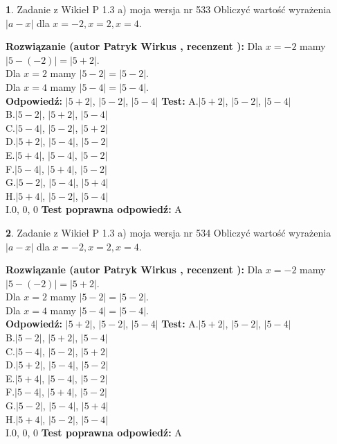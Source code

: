 \documentclass[12pt, a4paper]{article}
\theoremstyle{definition} %
\newtheorem{zad}{}
\newcommand{\zadStart}[1]{\begin{zad}#1\newline}
\newcommand{\zadStop}{\end{zad}}
\newcommand{\rozwStart}[2]{\noindent \textbf{Rozwiązanie (autor #1 , recenzent #2): }\newline}
\newcommand{\rozwStop}{\newline}
\newcommand{\odpStart}{\noindent \textbf{Odpowiedź:}\newline}
\newcommand{\odpStop}{\newline}
\newcommand{\testStart}{\noindent \textbf{Test:}\newline}
\newcommand{\testStop}{\newline}
\newcommand{\kluczStart}{\noindent \textbf{Test poprawna odpowiedź:}\newline}
\newcommand{\kluczStop}{\newline}
\begin{document}
\zadStart{Zadanie z Wikieł P 1.3 a) moja wersja nr 533}
Obliczyć wartość wyrażenia $|a - x|$ dla $x=-2,x=2,x=4$.
\zadStop
\rozwStart{Patryk Wirkus}{}
Dla $x = -2$ mamy $|5 - (-2)| = |5 + 2|$.\\
Dla $x = 2$ mamy $|5 - 2| = |5 - 2|$.\\
Dla $x = 4$ mamy $|5 - 4| = |5 - 4|$.\\
\rozwStop
\odpStart
$|5 + 2|$, $|5 - 2|$, $|5 - 4|$
\odpStop
\testStart
A.$|5 + 2|$, $|5 - 2|$, $|5 - 4|$\\
B.$|5 - 2|$, $|5 + 2|$, $|5 - 4|$\\
C.$|5 - 4|$, $|5 - 2|$, $|5 + 2|$\\
D.$|5 + 2|$, $|5 - 4|$, $|5 - 2|$\\
E.$|5 + 4|$, $|5 - 4|$, $|5 - 2|$\\
F.$|5 - 4|$, $|5 + 4|$, $|5 - 2|$\\
G.$|5 - 2|$, $|5 - 4|$, $|5 + 4|$\\
H.$|5 + 4|$, $|5 - 2|$, $|5 - 4|$\\
I.$0$, $0$, $0$
\testStop
\kluczStart
A
\kluczStop



\zadStart{Zadanie z Wikieł P 1.3 a) moja wersja nr 534}
Obliczyć wartość wyrażenia $|a - x|$ dla $x=-2,x=2,x=4$.
\zadStop
\rozwStart{Patryk Wirkus}{}
Dla $x = -2$ mamy $|5 - (-2)| = |5 + 2|$.\\
Dla $x = 2$ mamy $|5 - 2| = |5 - 2|$.\\
Dla $x = 4$ mamy $|5 - 4| = |5 - 4|$.\\
\rozwStop
\odpStart
$|5 + 2|$, $|5 - 2|$, $|5 - 4|$
\odpStop
\testStart
A.$|5 + 2|$, $|5 - 2|$, $|5 - 4|$\\
B.$|5 - 2|$, $|5 + 2|$, $|5 - 4|$\\
C.$|5 - 4|$, $|5 - 2|$, $|5 + 2|$\\
D.$|5 + 2|$, $|5 - 4|$, $|5 - 2|$\\
E.$|5 + 4|$, $|5 - 4|$, $|5 - 2|$\\
F.$|5 - 4|$, $|5 + 4|$, $|5 - 2|$\\
G.$|5 - 2|$, $|5 - 4|$, $|5 + 4|$\\
H.$|5 + 4|$, $|5 - 2|$, $|5 - 4|$\\
I.$0$, $0$, $0$
\testStop
\kluczStart
A
\kluczStop
\end{document}
